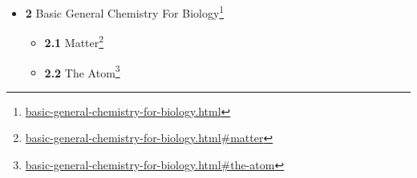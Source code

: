 \documentclass[
]{article}
\providecommand{\tightlist}{%
  \setlength{\itemsep}{0pt}\setlength{\parskip}{0pt}}
\providecommand{\tightlist}{%
  \setlength{\itemsep}{0pt}\setlength{\parskip}{0pt}}
\let\rmarkdownfootnote\footnote%
\def\footnote{\protect\rmarkdownfootnote}
\renewcommand{\href}[2]{#2\footnote{\url{#1}}}
\theoremstyle{definition}
\theoremstyle{definition}
\theoremstyle{definition}
\theoremstyle{remark}
\begin{document}
\begin{itemize}
\begin{itemize}
    \begin{itemize}
    \tightlist
    \item
      \href{biology-the-science-of-life.html\#scientific-terminology}{\emph{}\textbf{1.5.1}
      Scientific Terminology}
    \item
      \href{biology-the-science-of-life.html\#the-scientific-method}{\emph{}\textbf{1.5.2}
      The Scientific Method}
    \item
      \href{biology-the-science-of-life.html\#dissemination-of-scientific-knowledge}{\emph{}\textbf{1.5.3}
      Dissemination of Scientific Knowledge}
    \end{itemize}
  \item
    \href{biology-the-science-of-life.html\#philosophy-of-science}{\emph{}\textbf{1.6}
    Philosophy of Science}
  \item
    \href{biology-the-science-of-life.html\#science-and-religion}{\emph{}\textbf{1.7}
    Science And Religion}
  \end{itemize}
\item
  \href{basic-general-chemistry-for-biology.html}{\emph{}\textbf{2}
  Basic General Chemistry For Biology}

  \begin{itemize}
  \tightlist
  \item
    \href{basic-general-chemistry-for-biology.html\#matter}{\emph{}\textbf{2.1}
    Matter}
  \item
    \href{basic-general-chemistry-for-biology.html\#the-atom}{\emph{}\textbf{2.2}
    The Atom}


\end{itemize}
\end{itemize}
\end{document}
